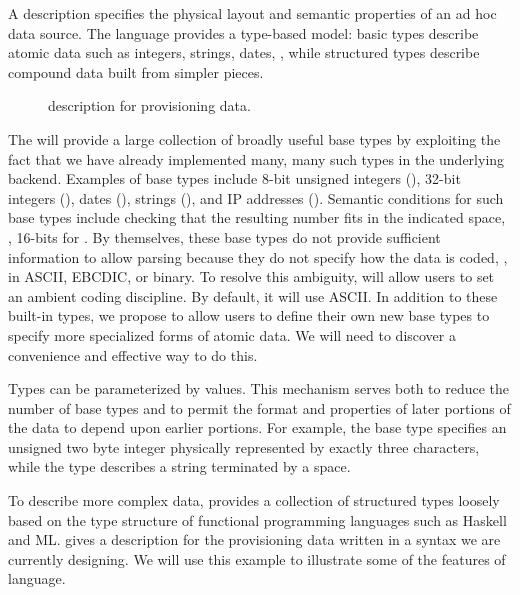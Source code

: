 \documentclass{entcs}
\begin{document}
A \datatype{} description specifies the physical layout and semantic
properties of an ad hoc data source.  The language provides a
type-based model: basic types describe atomic data such as integers,
strings, dates, \etc{}, while structured types describe compound data
built from simpler pieces.  \suppressfloats


\begin{figure}
\begin {code}

\end{code}
\caption{\datatype{} description for \dibbler{} provisioning data.}
\label{figure:dibblerml}
\end{figure}

The \datatype{} will provide a large collection of broadly useful base
types by exploiting the fact that we have already implemented many,
many such types in the underlying \pads{} backend.  Examples of base
types include 8-bit unsigned integers (), 32-bit
integers (), dates (), strings (),
and IP addresses ().  Semantic conditions for such base types
include checking that the resulting number fits in the indicated
space, \ie, 16-bits for .  By themselves, these base types
do not provide sufficient information to allow parsing because they do
not specify how the data is coded, \ie{}, in ASCII, EBCDIC, or binary.
To resolve this ambiguity, \datatype{} will allow users to set an
ambient coding discipline.  By default, it will use ASCII.  In addition to
these built-in types, we propose to allow users to define their own new base 
types to specify more specialized forms of atomic data.  We
will need to discover a convenience and effective way to do this.

Types can be parameterized by values.  This mechanism serves
both to reduce the number of base types and to permit the format and
properties of later portions of the data to depend upon earlier
portions.  For example, the base type  specifies
an unsigned two byte integer physically represented by exactly three
characters, while the type  describes a string
terminated by a space.

To describe more complex data, \datatype{} provides a collection of
structured types loosely based on the type structure of functional
programming languages such as Haskell and ML.  
 gives a \datatype{} description for the
\dibbler{} provisioning data written in a syntax we are currently
designing.  We will use this example to illustrate some of the
features of \datatype{} language.  
\end{document}
